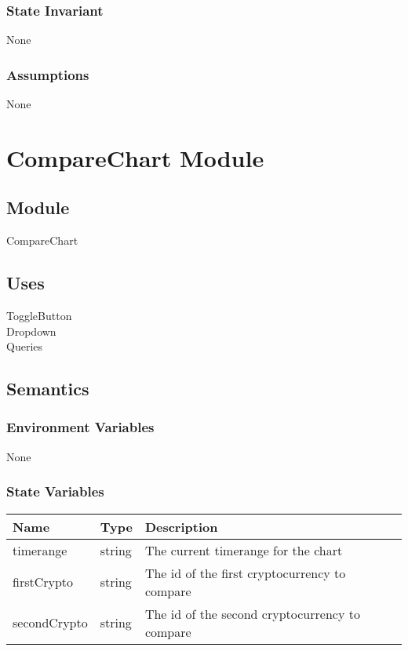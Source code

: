 \documentclass[12pt]{article}
\begin{document}
\subsubsection{State Invariant}
None

\subsubsection{Assumptions}
None

\newpage


\section{CompareChart Module}

\subsection{Module}
CompareChart

\subsection{Uses}
ToggleButton\\
Dropdown \\
Queries

\subsection{Semantics}

\subsubsection{Environment Variables}
None

\subsubsection{State Variables}
\begin{tabular}{| l | l | p{10cm} |}
    \hline
    \textbf{Name} & \textbf{Type} & \textbf{Description}\\ \hline
    timerange & string & The current timerange for the chart\\ \hline
    firstCrypto & string & The id of the first cryptocurrency to compare\\ \hline
    secondCrypto & string & The id of the second cryptocurrency to compare\\ \hline
\end{tabular}
\end{document}
